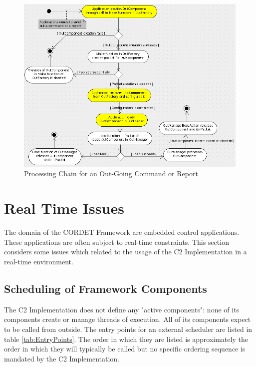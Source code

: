 \documentclass[a4paper,10pt]{article}
\let\stdsection\section
\renewcommand\section{\newpage\stdsection}
\begin{document}
\begin{figure}[H]
 \centering
 \includegraphics[scale=0.40,keepaspectratio=true]{OutCmpMakeRelChain.png}
 \caption{Processing Chain for an Out-Going Command or Report}
 \label{fig:OutCmpMakeRelChain}
\end{figure}

\clearpage
\section{Real Time Issues}\label{sec:RTIssues}
The domain of the CORDET Framework are embedded control applications. These applications are often subject to real-time constraints. This section considers some issues which related to the usage of the C2 Implementation in a real-time environment.

\subsection{Scheduling of Framework Components}
The C2 Implementation does not define any "active components": none of its components create or manage threads of execution. All of its components expect to be called from outside. The entry points for an external scheduler are listed in table \ref{tab:EntryPoints}. The order in which they are listed is approximately the order in which they will typically be called but no specific ordering sequence is mandated by the C2 Implementation. 
\end{document}
